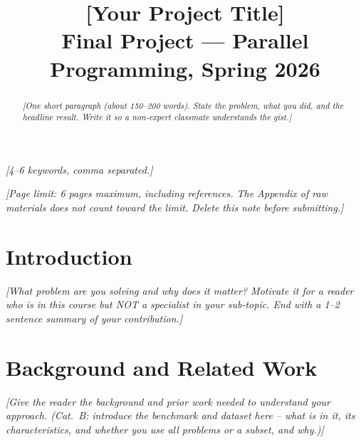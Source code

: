\documentclass[conference]{IEEEtran}
\newcommand{\guide}[1]{{\color{gray}\textit{[#1]}}}
\begin{document}
\title{[Your Project Title]\\
{\footnotesize Final Project --- Parallel Programming, Spring 2026}}

\author{%
%
}

\maketitle

\begin{abstract}
\guide{One short paragraph (about 150--200 words). State the problem, what you
did, and the headline result. Write it so a non-expert classmate understands the
gist.}
\end{abstract}

\begin{IEEEkeywords}
\guide{4--6 keywords, comma separated.}
\end{IEEEkeywords}

\vspace{0.5em}
\noindent{}

\vspace{0.4em}
{\color{gray}\footnotesize\textit{[Page limit: 6 pages maximum, including
references. The Appendix of raw materials does not count toward the limit.
Delete this note before submitting.]}}

\section{Introduction}
\guide{What problem are you solving and why does it matter? Motivate it for a
reader who is in this course but NOT a specialist in your sub-topic. End with a
1--2 sentence summary of your contribution.}

\section{Background and Related Work}
\guide{Give the reader the background and prior work needed to understand your
approach. (Cat.~B: introduce the benchmark and dataset here -- what is in it,
its characteristics, and whether you use all problems or a subset, and why.)}
\end{document}
